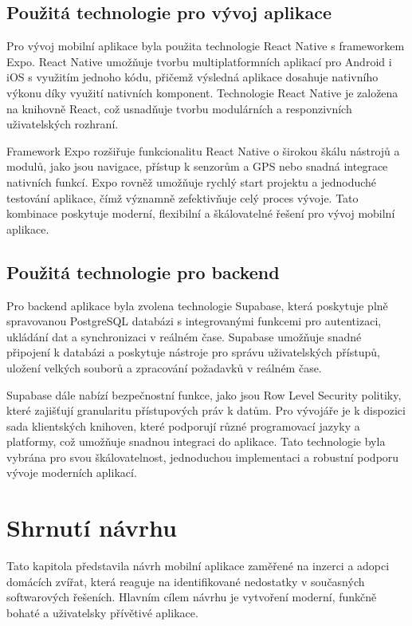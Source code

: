 \documentclass[12pt,a4paper]{report}
\begin{document}
\subsection{Použitá technologie pro vývoj aplikace}

Pro vývoj mobilní aplikace byla použita technologie React Native s frameworkem Expo. React Native umožňuje tvorbu multiplatformních aplikací pro Android i iOS s využitím jednoho kódu, přičemž výsledná aplikace dosahuje nativního výkonu díky využití nativních komponent. Technologie React Native je založena na knihovně React, což usnadňuje tvorbu modulárních a responzivních uživatelských rozhraní.

Framework Expo rozšiřuje funkcionalitu React Native o širokou škálu nástrojů a modulů, jako jsou navigace, přístup k senzorům a GPS nebo snadná integrace nativních funkcí. Expo rovněž umožňuje rychlý start projektu a jednoduché testování aplikace, čímž významně zefektivňuje celý proces vývoje. Tato kombinace poskytuje moderní, flexibilní a škálovatelné řešení pro vývoj mobilní aplikace.


\subsection{Použitá technologie pro backend}

Pro backend aplikace byla zvolena technologie Supabase, která poskytuje plně spravovanou PostgreSQL databázi s integrovanými funkcemi pro autentizaci, ukládání dat a synchronizaci v reálném čase. Supabase umožňuje snadné připojení k databázi a poskytuje nástroje pro správu uživatelských přístupů, uložení velkých souborů a zpracování požadavků v reálném čase.

Supabase dále nabízí bezpečnostní funkce, jako jsou Row Level Security politiky, které zajišťují granularitu přístupových práv k datům. Pro vývojáře je k dispozici sada klientských knihoven, které podporují různé programovací jazyky a platformy, což umožňuje snadnou integraci do aplikace. Tato technologie byla vybrána pro svou škálovatelnost, jednoduchou implementaci a robustní podporu vývoje moderních aplikací.


\section{Shrnutí návrhu}

Tato kapitola představila návrh mobilní aplikace zaměřené na inzerci a adopci domácích zvířat, která reaguje na identifikované nedostatky v současných softwarových řešeních. Hlavním cílem návrhu je vytvoření moderní, funkčně bohaté a uživatelsky přívětivé aplikace.
\end{document}
